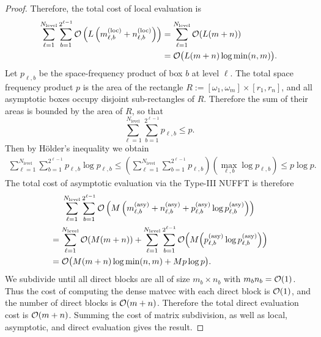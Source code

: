 \begin{proof}
    Therefore, the total cost of local evaluation is 
    \begin{equation}
      \begin{aligned}
        \sum_{\ell=1}^{N_{\text{level}}} \sum_{b=1}^{2^{\ell-1}} \mathcal{O}\left(L\left(m_{\ell,b}^{(\text{loc})} + n_{\ell,b}^{(\text{loc})}\right)\right)
        &= \sum_{\ell=1}^{N_{\text{level}}} \mathcal{O}(L(m + n)) \\
        &= \mathcal{O}\big(L (m + n) \log \min(n,m)\big).
      \end{aligned}
    \end{equation}
    Let $p_{\ell,b}$ be the space-frequency product of box $b$ at level $\ell$.
    The total space frequency product $p$ is the area of the rectangle $R :=
    [\omega_1, \omega_m] \times [r_1, r_n]$, and all asymptotic boxes occupy
    disjoint sub-rectangles of $R$. Therefore the sum of their areas is bounded
    by the area of $R$, so that $$\sum_{\ell=1}^{N_{\text{level}}}
    \sum_{b=1}^{2^{\ell-1}} p_{\ell,b} \leq p.$$ Then by H\"older's inequality we
    obtain 
    \begin{align} 
        \sum_{\ell=1}^{N_{\text{level}}} \sum_{b=1}^{2^{\ell-1}} p_{\ell,b} \log p_{\ell,b}
        \leq \left( \sum_{\ell=1}^{N_{\text{level}}} \sum_{b=1}^{2^{\ell-1}} p_{\ell,b} \right) \left(\max_{\ell,b} \log p_{\ell,b} \right) 
        \leq p \log p.
    \end{align}
    The total cost of asymptotic evaluation via the Type-III NUFFT is therefore
    \begin{multline}
      \sum_{\ell=1}^{N_{\text{level}}} \sum_{b=1}^{2^{\ell-1}}
        \mathcal{O}\left(M\left(m_{\ell,b}^{(\text{asy})} + n_{\ell,b}^{(\text{asy})} +
            p_{\ell,b}^{(\text{asy})} \log p_{\ell,b}^{(\text{asy})}
          \right)\right) \\
        \begin{aligned}
        &= \sum_{\ell=1}^{N_{\text{level}}} \mathcal{O}(M(m + n)) +
        \sum_{\ell=1}^{N_{\text{level}}} \sum_{b=1}^{2^{\ell-1}}
        \mathcal{O}\Big(M\Big(p_{\ell,b}^{(\text{asy})} \log
          p_{\ell,b}^{(\text{asy})}\Big)\Big)\\
        &= \mathcal{O}\big(M (m + n) \log \min(n,m) + Mp\log p\big).
        \end{aligned}
      \end{multline}
    We subdivide until all direct blocks are all of size $m_b \times n_b$ with
    $m_bn_b = \mathcal{O}(1)$. Thus the cost of computing the dense matvec with each
    direct block is $\mathcal{O}(1)$, and the number of direct blocks is $\mathcal{O}(m + n)$.
    Therefore the total direct evaluation cost is $\mathcal{O}(m + n)$. Summing the cost
    of matrix subdivision, as well as local, asymptotic, and direct evaluation gives the result.
\end{proof}

